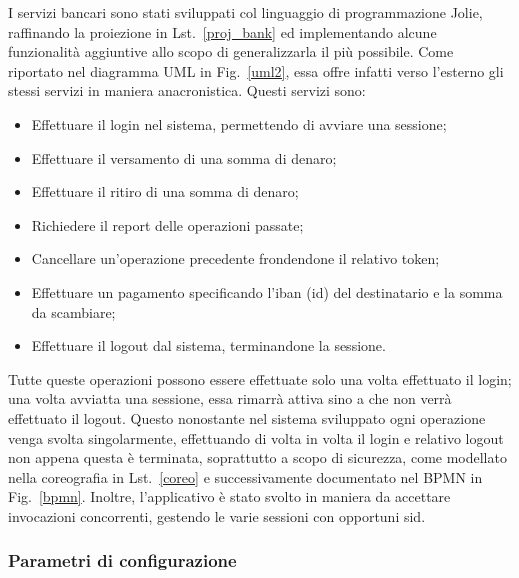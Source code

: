 \documentclass[11pt]{article} %
\begin{document}
I servizi bancari sono stati sviluppati col linguaggio di programmazione Jolie, raffinando la proiezione in Lst.~\ref{proj_bank} ed implementando alcune funzionalità aggiuntive allo scopo di generalizzarla il più possibile. Come riportato nel diagramma UML in Fig.~\ref{uml2}, essa offre infatti verso l'esterno gli stessi servizi in maniera anacronistica. Questi servizi sono:
\begin{itemize}
\item Effettuare il login nel sistema, permettendo di avviare una sessione;
\item Effettuare il versamento di una somma di denaro;
\item Effettuare il ritiro di una somma di denaro;
\item Richiedere il report delle operazioni passate;
\item Cancellare un'operazione precedente frondendone il relativo token;
\item Effettuare un pagamento specificando l'iban (id) del destinatario e la somma da scambiare;
\item Effettuare il logout dal sistema, terminandone la sessione.
\end{itemize}
Tutte queste operazioni possono essere effettuate solo una volta effettuato il login; una volta avviatta una sessione, essa rimarrà attiva sino a che non verrà effettuato il logout. Questo nonostante nel sistema sviluppato ogni operazione venga svolta singolarmente, effettuando di volta in volta il login e relativo logout non appena questa è terminata, soprattutto a scopo di sicurezza, come modellato nella coreografia in Lst.~\ref{coreo} e successivamente documentato nel BPMN in Fig.~\ref{bpmn}. Inoltre, l'applicativo è stato svolto in maniera da accettare invocazioni concorrenti, gestendo le varie sessioni con opportuni sid.

\subsubsection{Parametri di configurazione}
\end{document}
